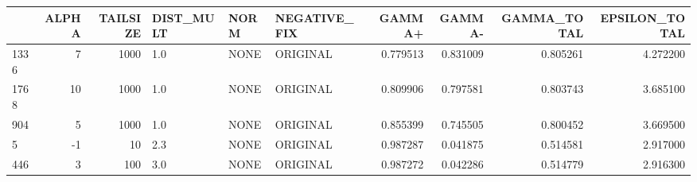 \begin{tabular}{lrrlllrrrr}
\toprule
 & ALPHA & TAILSIZE & DIST_MULT & NORM & NEGATIVE_FIX & GAMMA+ & GAMMA- & GAMMA_TOTAL & EPSILON_TOTAL \\
\midrule
1336 & 7 & 1000 & 1.0 & NONE & ORIGINAL & 0.779513 & 0.831009 & 0.805261 & 4.272200 \\
1768 & 10 & 1000 & 1.0 & NONE & ORIGINAL & 0.809906 & 0.797581 & 0.803743 & 3.685100 \\
904 & 5 & 1000 & 1.0 & NONE & ORIGINAL & 0.855399 & 0.745505 & 0.800452 & 3.669500 \\
5 & -1 & 10 & 2.3 & NONE & ORIGINAL & 0.987287 & 0.041875 & 0.514581 & 2.917000 \\
446 & 3 & 100 & 3.0 & NONE & ORIGINAL & 0.987272 & 0.042286 & 0.514779 & 2.916300 \\
\bottomrule
\end{tabular}
